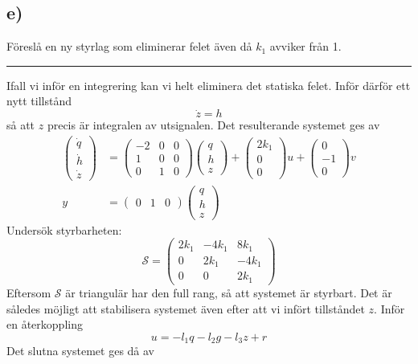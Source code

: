 \documentclass[12pt]{article}
\newcommand{\qline}{\hrule \vspace*{10pt}}
\begin{document}
\subsection*{e)}
Föreslå en ny styrlag som eliminerar felet även då $k_1$ avviker från 1.
\qline
Ifall vi inför en integrering kan vi helt eliminera det statiska felet. Inför därför ett nytt tillstånd 
\[\dot{z} = h\]
så att $z$ precis är integralen av utsignalen. Det resulterande systemet ges av
\begin{align*}
  \begin{pmatrix}
    \dot{q} \\
    \dot{h} \\
    \dot{z}
  \end{pmatrix} &= \begin{pmatrix}
-2 & 0 & 0 \\
1 & 0 & 0 \\
0 & 1 & 0
  \end{pmatrix}\begin{pmatrix}
q \\
h \\
z
  \end{pmatrix} + \begin{pmatrix}
2k_1 \\
0 \\
0
  \end{pmatrix}u + \begin{pmatrix}
0 \\
-1 \\
0
  \end{pmatrix}v \\
y &= \begin{pmatrix}
0 & 1 & 0
\end{pmatrix}\begin{pmatrix}
q \\
h \\
z
\end{pmatrix}
\end{align*}
Undersök styrbarheten: 
\[\mathcal{S} = \begin{pmatrix}
2k_1 & -4k_1 & 8k_1 \\
0 & 2k_1 & -4k_1 \\
0 & 0 & 2k_1
\end{pmatrix}\]
Eftersom $\mathcal{S}$ är triangulär har den full rang, så att systemet är styrbart. Det är således möjligt att stabilisera systemet även efter att vi infört tillståndet $z$. Inför en återkoppling 
\[u = -l_1q-l_2g-l_3z + r\]
Det slutna systemet ges då av 
\end{document}
